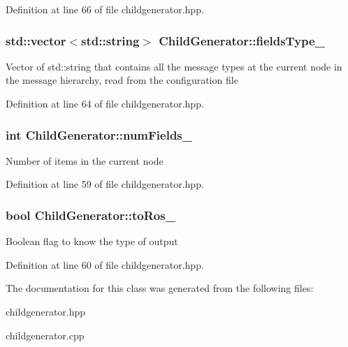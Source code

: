 Definition at line 66 of file childgenerator.\-hpp.

\hypertarget{classChildGenerator_a410cf2b350df1977ac4679bb608859cf}{
\subsubsection[{fields\-Type\-\_\-}]{\setlength{\rightskip}{0pt plus 5cm}std\-::vector$<$std\-::string$>$ Child\-Generator\-::fields\-Type\-\_\-\hspace{0.3cm}{\ttfamily [private]}}}\label{classChildGenerator_a410cf2b350df1977ac4679bb608859cf}
Vector of std\-::string that contains all the message types at the current node in the message hierarchy, read from the configuration file 

Definition at line 64 of file childgenerator.\-hpp.

\hypertarget{classChildGenerator_ad485f88e3559a3643c700f8c39e76035}{
\subsubsection[{num\-Fields\-\_\-}]{\setlength{\rightskip}{0pt plus 5cm}int Child\-Generator\-::num\-Fields\-\_\-\hspace{0.3cm}{\ttfamily [private]}}}\label{classChildGenerator_ad485f88e3559a3643c700f8c39e76035}
Number of items in the current node 

Definition at line 59 of file childgenerator.\-hpp.

\hypertarget{classChildGenerator_a7b1a36a6a5679fbd2d54682b6cb0527b}{
\subsubsection[{to\-Ros\-\_\-}]{\setlength{\rightskip}{0pt plus 5cm}bool Child\-Generator\-::to\-Ros\-\_\-\hspace{0.3cm}{\ttfamily [private]}}}\label{classChildGenerator_a7b1a36a6a5679fbd2d54682b6cb0527b}
Boolean flag to know the type of output 

Definition at line 60 of file childgenerator.\-hpp.



The documentation for this class was generated from the following files\-:\begin{DoxyCompactItemize}
\item 
childgenerator.\-hpp\item 
childgenerator.\-cpp\end{DoxyCompactItemize}
